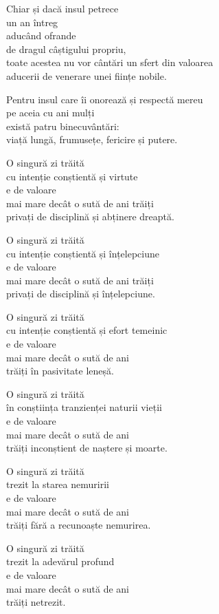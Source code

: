 Chiar și dacă insul petrece\\
un an întreg\\
aducând ofrande\\
de dragul câștigului propriu,\\
toate acestea nu vor cântări un sfert din valoarea\\
aducerii de venerare unei ființe nobile.


Pentru insul care îi onorează și respectă mereu\\
pe aceia cu ani mulți\\
există patru binecuvântări:\\
viață lungă, frumusețe, fericire și putere.


O singură zi trăită\\
cu intenție conștientă și virtute\\
e de valoare\\
mai mare decât o sută de ani trăiți\\
privați de disciplină și abținere dreaptă.


O singură zi trăită\\
cu intenție conștientă și înțelepciune\\
e de valoare\\
mai mare decât o sută de ani trăiți\\
privați de disciplină și înțelepciune.


O singură zi trăită\\
cu intenție conștientă și efort temeinic\\
e de valoare\\
mai mare decât o sută de ani\\
trăiți în pasivitate leneșă.


O singură zi trăită\\
în conștiința tranzienței naturii vieții\\
e de valoare\\
mai mare decât o sută de ani\\
trăiți inconștient de naștere și moarte.


O singură zi trăită\\
trezit la starea nemuririi\\
e de valoare\\
mai mare decât o sută de ani\\
trăiți fără a recunoaște nemurirea.

O singură zi trăită\\
trezit la adevărul profund\\
e de valoare\\
mai mare decât o sută de ani\\
trăiți netrezit.

